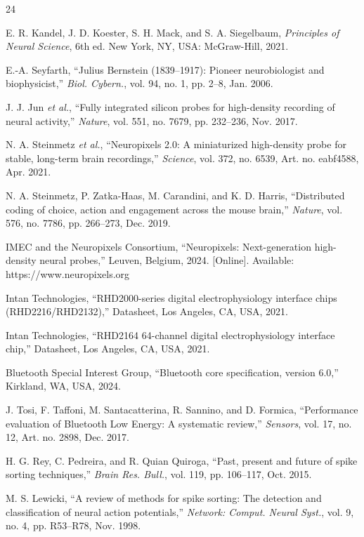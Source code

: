 \documentclass[11pt]{article}
\begin{document}
{}
\begin{thebibliography}{24}

 E. R. Kandel, J. D. Koester, S. H. Mack, and S. A. Siegelbaum, \emph{Principles of Neural Science}, 6th ed. New York, NY, USA: McGraw-Hill, 2021.

 E.-A. Seyfarth, ``Julius Bernstein (1839--1917): Pioneer neurobiologist and biophysicist,'' \emph{Biol. Cybern.}, vol. 94, no. 1, pp. 2--8, Jan. 2006.

 J. J. Jun \emph{et al.}, ``Fully integrated silicon probes for high-density recording of neural activity,'' \emph{Nature}, vol. 551, no. 7679, pp. 232--236, Nov. 2017.

 N. A. Steinmetz \emph{et al.}, ``Neuropixels 2.0: A miniaturized high-density probe for stable, long-term brain recordings,'' \emph{Science}, vol. 372, no. 6539, Art. no. eabf4588, Apr. 2021.

 N. A. Steinmetz, P. Zatka-Haas, M. Carandini, and K. D. Harris, ``Distributed coding of choice, action and engagement across the mouse brain,'' \emph{Nature}, vol. 576, no. 7786, pp. 266--273, Dec. 2019.

 IMEC and the Neuropixels Consortium, ``Neuropixels: Next-generation high-density neural probes,'' Leuven, Belgium, 2024. [Online]. Available: https://www.neuropixels.org

 Intan Technologies, ``RHD2000-series digital electrophysiology interface chips (RHD2216/RHD2132),'' Datasheet, Los Angeles, CA, USA, 2021.

 Intan Technologies, ``RHD2164 64-channel digital electrophysiology interface chip,'' Datasheet, Los Angeles, CA, USA, 2021.

 Bluetooth Special Interest Group, ``Bluetooth core specification, version 6.0,'' Kirkland, WA, USA, 2024.

 J. Tosi, F. Taffoni, M. Santacatterina, R. Sannino, and D. Formica, ``Performance evaluation of Bluetooth Low Energy: A systematic review,'' \emph{Sensors}, vol. 17, no. 12, Art. no. 2898, Dec. 2017.

 H. G. Rey, C. Pedreira, and R. Quian Quiroga, ``Past, present and future of spike sorting techniques,'' \emph{Brain Res. Bull.}, vol. 119, pp. 106--117, Oct. 2015.

 M. S. Lewicki, ``A review of methods for spike sorting: The detection and classification of neural action potentials,'' \emph{Network: Comput. Neural Syst.}, vol. 9, no. 4, pp. R53--R78, Nov. 1998.


\end{thebibliography}
\end{document}

